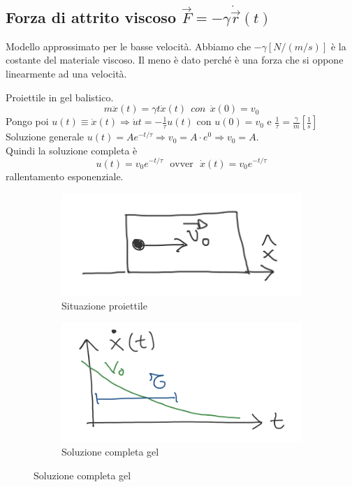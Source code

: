 \subsection{Forza di attrito viscoso $\vec{F} = -\gamma\dot{\vec{r}}(t)$}
Modello approssimato per le basse velocità. Abbiamo che $-\gamma [N/(m/s)]$ è la costante del materiale viscoso. Il meno è dato perché è una forza
che si oppone linearmente ad una velocità.
\begin{example}
    Proiettile in gel balistico.
    $$m\ddot{x}(t) = \gamma t \dot{x}(t) \:\: con \:\: \dot{x}(0) = v_0$$
    Pongo poi $u(t) \equiv \dot{x}(t) \Rightarrow \dot{u} t = -\frac{1}{\tau}u(t)$ con $u(0) = v_0$ e $\frac{1}{\tau} = \frac{\gamma}{m}[\frac{1}{s}]$\\
    Soluzione generale $u(t) = A e^{-t/\tau} \Rightarrow v_0 = A \cdot e^0 \Rightarrow v_0 = A$.\\
    Quindi la soluzione completa è
    $$u(t) = v_0 e^{-t/\tau} \:\:\: \text{ovver} \:\:\: \dot{x}(t) = v_0 e^{-t/\tau}$$
    rallentamento esponenziale.
\end{example}
\begin{figure}[h!]
    \centering
    \begin{subfigure}[b]{0.3\textwidth}
        \centering
        \includegraphics[width=\textwidth]{images/proiettile-gel-balistico-1.png}
        \caption*{Situazione proiettile}
    \end{subfigure}
    \begin{subfigure}[b]{0.3\textwidth}
        \centering
        \includegraphics[width=\textwidth]{images/proiettile-gel-balitstico-2.png}
        \caption*{Soluzione completa gel}
    \end{subfigure}
\end{figure}

